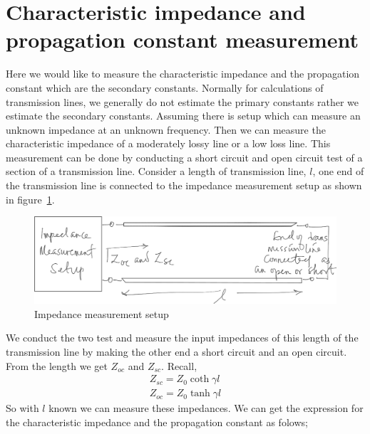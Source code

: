 \section{Characteristic impedance and propagation constant measurement}
Here we would like to measure the characteristic impedance and the propagation constant which are the secondary constants. Normally for calculations of transmission lines, we generally do not estimate the primary constants rather we estimate the secondary constants. Assuming there is setup which can measure an unknown impedance at an unknown frequency. Then we can measure the characteristic impedance of a moderately lossy line or a low loss line. This measurement can be done by conducting a short circuit and open circuit test of a section of a transmission line. Consider a length of transmission line, $l$, one end of the transmission line is connected to the impedance measurement setup as shown in figure~\ref{fig:impmeasurement}.
\begin{figure}[h]
\centering
\includegraphics[width=1\linewidth]{"./graphics/impedance_measurement_temp"}
\caption{Impedance measurement setup}
\label{fig:impmeasurement}
\end{figure}

We conduct the two test and measure the input impedances of this length of the transmission line by making the other end a short circuit and an open circuit. From the length we get $Z_{oc}$ and $Z_{sc}$. Recall,
\begin{align}
Z_{sc} = Z_0 \coth\gamma l\label{eqn:zsclossy}\\
Z_{oc} = Z_0 \tanh\gamma l\label{eqn:zoclossy}
\end{align}
So with $l$ known we can measure these impedances. We can get the expression for the characteristic impedance and the propagation constant as folows;

